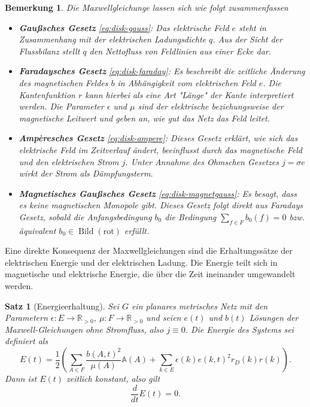 \documentclass[11pt,a4paper,leqno]{report}
\newtheorem{proposition}{Satz}[chapter]
\newtheorem{remark}[theorem]{Bemerkung}
\numberwithin{equation}{chapter}
\begin{document}
\begin{remark} Die Maxwellgleichunge lassen sich wie folgt zusammenfassen
	\begin{itemize}
		\item \textbf{Gaußsches Gesetz} \eqref{eq:disk-gauss}: Das elektrische Feld \( e \) steht in Zusammenhang mit der elektrischen Ladungsdichte \( q \). Aus der Sicht der Flussbilanz stellt \( q \) den Nettofluss von Feldlinien aus einer Ecke dar.
		
		\item \textbf{Faradaysches Gesetz} \eqref{eq:disk-faraday}: Es beschreibt die zeitliche Änderung des magnetischen Feldes \( b \) in Abhängigkeit vom elektrischen Feld \( e \). Die Kantenfunktion \( r \) kann hierbei als eine Art "Länge" der Kante interpretiert werden. Die Parameter \( \epsilon \) und \( \mu \) sind der elektrische beziehungsweise der magnetische Leitwert und geben an, wie gut das Netz das Feld leitet.
		
		\item \textbf{Ampèresches Gesetz} \eqref{eq:disk-ampere}: Dieses Gesetz erklärt, wie sich das elektrische Feld im Zeitverlauf ändert, beeinflusst durch das magnetische Feld und den elektrischen Strom \( j \). Unter Annahme des Ohmschen Gesetzes \( j = \sigma e \) wirkt der Strom als Dämpfungsterm.
		
		\item \textbf{Magnetisches Gaußsches Gesetz} \eqref{eq:disk-magnetgauss}: Es besagt, dass es keine magnetischen Monopole gibt. Dieses Gesetz folgt direkt aus Faradays Gesetz, sobald die Anfangsbedingung \( b_0 \) die Bedingung \( \sum_{f \in F} b_0(f) = 0 \) bzw. äquivalent \( b_0 \in  \operatorname{Bild}(\mathrm{rot}) \) erfüllt.
	\end{itemize}
\end{remark}
\noindent
Eine direkte Konsequenz der Maxwellgleichungen sind die Erhaltungssätze der elektrischen Energie und der elektrischen Ladung. Die Energie teilt sich in magnetische und elektrische Energie, die über die Zeit ineinander umgewandelt werden.
\begin{proposition}[Energieerhaltung]\label{thm:Energieerhaltung}
	Sei $G$ ein planares metrisches Netz mit den Parametern $ \epsilon: E \to \mathbb{R}_{>0}$, $ \mu: F \to \mathbb{R}_{>0}$  
	und seien $e(t)$ und $b(t)$ Lösungen der Maxwell-Gleichungen ohne Stromfluss, also $j \equiv 0$.  
	Die Energie des Systems sei definiert als
	\[
	E(t) = \frac{1}{2} \left(\sum_{A \in F} \frac{b(A,t)^2}{\mu(A)}\mathbb{A}(A) + \sum_{k \in E} \epsilon(k) e(k,t)^2r_D(k)r(k)\right).
	\]
	Dann ist $E(t)$ zeitlich konstant, also gilt
	\[
	\frac{d}{dt} E(t) = 0.
	\]
\end{proposition}
\end{document}
